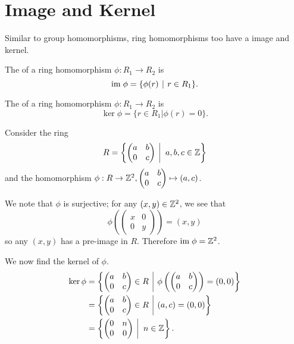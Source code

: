 \section{Image and Kernel}
Similar to group homomorphisms, ring homomorphisms too have a image and kernel.
\begin{definition}
    The  of a ring homomorphism $\phi: R_1 \to R_2$ is
    \[
        \im\phi = \{\phi(r) \vert r \in R_1\}.
    \]
\end{definition}
\begin{definition}
    The  of a ring homomorphism $\phi:R_1 \to R_2$ is
    \[
        \ker\phi = \{r \in R_1 \vert \phi(r) = 0\}.
    \]
\end{definition}

\begin{example}\label{example-homomorphism-on-upper-triangle-matrices}
    Consider the ring
    \[
        R = \left\{\begin{pmatrix}a&b\\0&c\end{pmatrix}\vert a,b,c\in\Z\right\}
    \]
    and the homomorphism $\phi: R \to \mathbb{Z}^2, \begin{pmatrix}a&b\\0&c\end{pmatrix} \mapsto (a,c)$.

    We note that $\phi$ is surjective; for any $(x,y)\in\mathbb{Z}^2$, we see that
    \[
        \phi\left(\begin{pmatrix}x&0\\0&y\end{pmatrix}\right) = (x,y)
    \]
    so any $(x,y)$ has a pre-image in $R$. Therefore $\mathrm{im}\; \phi = \mathbb{Z}^2$.

    We now find the kernel of $\phi$.
    \begin{align*}
        \ker\phi &= \left\{\begin{pmatrix}a&b\\0&c\end{pmatrix} \in R \vert \phi\left(\begin{pmatrix}a&b\\0&c\end{pmatrix}\right) = (0,0)\right\}\\
        &= \left\{\begin{pmatrix}a&b\\0&c\end{pmatrix} \in R \vert (a,c) = (0,0)\right\}\\
        &= \left\{\begin{pmatrix}0&n\\0&0\end{pmatrix} \vert n \in \Z\right\}.
    \end{align*}
\end{example}

